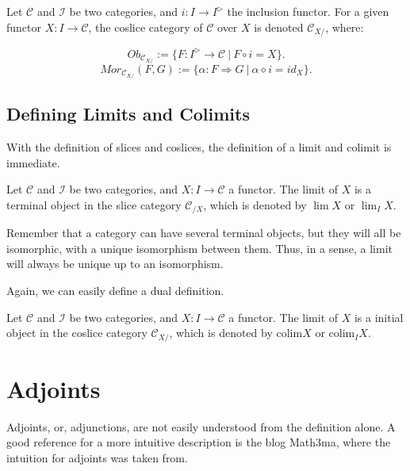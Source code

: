 \begin{definition}
	Let $\mathcal C$ and $\mathcal I$ be two categories, and $i:I \to I^{\rhd}$ the
	inclusion functor. For a given functor $X:I \to \mathcal C$, the coslice category
	of $\mathcal C$ over $X$ is denoted $\mathcal C_{X/}$, where:

	\begin{displaymath}
		Ob_{\mathcal C_{X/}}:=\{
		F: I^\rhd \to \mathcal C \ | \ F \circ i = X
		\}.
	\end{displaymath}
	\begin{displaymath}
		Mor_{\mathcal C_{X/}}(F,G):=\{
		\alpha: F \Rightarrow G \ | \ \alpha \diamond i = id_{X}
		\}.
	\end{displaymath}
\end{definition}

\subsection{Defining Limits and Colimits}

With the definition of slices and coslices, the definition of a limit and
colimit is immediate.
\begin{definition}[Limit]
	Let $\mathcal C$ and $\mathcal I$ be two categories, and $X:I \to \mathcal C$
	a functor. The limit of $X$ is a terminal object in the slice category
	$\mathcal C_{/X}$, which is denoted by $\lim X$ or $\lim_I X$.
\end{definition}

Remember that a category can have several terminal objects, but they will all
be isomorphic, with a unique isomorphism between them. Thus, in a sense, a limit
will always be unique up to an isomorphism.

Again, we can easily define a dual definition.

\begin{definition}[Colimit]
	Let $\mathcal C$ and $\mathcal I$ be two categories, and $X:I \to \mathcal C$
	a functor. The limit of $X$ is a initial object in the coslice category
	$\mathcal C_{X/}$, which is denoted by $\text{colim} X$ or $\text{colim}_I X$.
\end{definition}


\section{Adjoints}

Adjoints, or, adjunctions, are not easily understood from the definition alone.
A good reference for a more intuitive description is the blog Math3ma, where the
intuition for adjoints was taken from.

